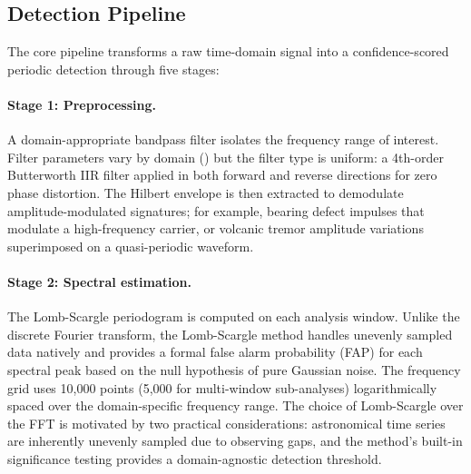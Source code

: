 \documentclass[11pt,a4paper]{article}
\begin{document}
\subsection{Detection Pipeline}
\label{sec:pipeline}

The core pipeline transforms a raw time-domain signal into a confidence-scored periodic detection through five stages:

\paragraph{Stage 1: Preprocessing.} A domain-appropriate bandpass filter isolates the frequency range of interest. Filter parameters vary by domain () but the filter type is uniform: a 4th-order Butterworth IIR filter applied in both forward and reverse directions for zero phase distortion. The Hilbert envelope is then extracted to demodulate amplitude-modulated signatures; for example, bearing defect impulses that modulate a high-frequency carrier, or volcanic tremor amplitude variations superimposed on a quasi-periodic waveform.

\paragraph{Stage 2: Spectral estimation.} The Lomb-Scargle periodogram is computed on each analysis window. Unlike the discrete Fourier transform, the Lomb-Scargle method handles unevenly sampled data natively and provides a formal false alarm probability (FAP) for each spectral peak based on the null hypothesis of pure Gaussian noise. The frequency grid uses 10{,}000 points (5{,}000 for multi-window sub-analyses) logarithmically spaced over the domain-specific frequency range. The choice of Lomb-Scargle over the FFT is motivated by two practical considerations: astronomical time series are inherently unevenly sampled due to observing gaps, and the method's built-in significance testing provides a domain-agnostic detection threshold.
\end{document}
